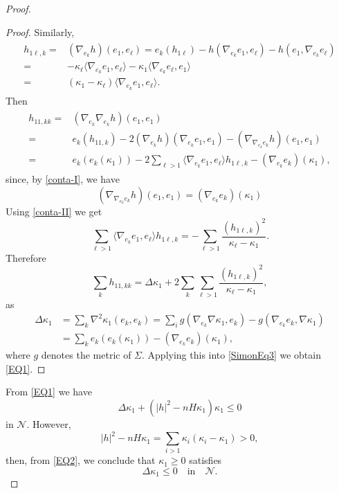 \documentclass[11pt]{amsart}
\theoremstyle{plain}
\numberwithin{equation}{section}
\numberwithin{theorem}{section}
\begin{document}
\begin{proof}
\begin{proof}
Similarly,
\begin{align}
	\begin{split}
		\label{conta-II}
	h_{1\ell  ,k}    = & \left(\nabla_{e_k} h\right)(e_1, e_\ell)  = e_k(h_{1\ell})-h\left(\nabla_{e_{k}}e_1 , e_\ell\right)-h\left(e_1,\nabla_{e_{k}}e_\ell\right) \\ =& -\kappa_\ell\langle \nabla_{e_k}e_1,e_\ell\rangle-\kappa_1\langle \nabla_{e_k}e_\ell,e_1\rangle \\ =& (\kappa_1-\kappa_\ell)\langle \nabla_{e_k}e_1,e_\ell\rangle.
	\end{split}
\end{align}
Then
\begin{align}
	\begin{split}
		\label{conta-I|I}
h_{11, kk} = & \left(\nabla_{e_k} \nabla_{e_k}  h\right)(e_1, e_1) \\  = & e_k \left( h_{11,k} \right)-2\left(\nabla_{e_k} h\right)(\nabla_{e_k}e_1, e_1) - \left(\nabla_{\nabla_{e_{k}} e_k} h\right)(e_1, e_1) \\   = & e_k\left(e_k(\kappa_1)\right)-2\sum_{\ell>1}\langle \nabla_{e_{k}}e_1, e_\ell\rangle h_{1\ell, k}-\left(\nabla_{e_{k}}e_k\right)(\kappa_1),
	\end{split}
\end{align}
since, by \eqref{conta-I}, we have
\[
 \left(\nabla_{\nabla_{e_{k}} e_k} h\right)(e_1, e_1) = \left(\nabla_{e_{k}}e_k\right)(\kappa_1)
\]
Using \eqref{conta-II} we get
\[
\sum_{\ell>1}\langle \nabla_{e_{k}}e_1, e_\ell\rangle h_{1\ell, k}= - \sum_{\ell>1}\dfrac{(h_{1\ell,k})^2}{\kappa_\ell-\kappa_1}.
\]
Therefore
\begin{equation*}
	\sum_{k} h_{11,kk}=\Delta \kappa_1+2\sum_k\sum_{\ell>1}\dfrac{(h_{1\ell,k})^2}{\kappa_\ell-\kappa_1},
\end{equation*}	
as 
\begin{align*}
\Delta\kappa_1&=\sum_k \nabla^2 \kappa_1(e_k,e_k)=\sum_ig\left( \nabla_{e_k}\nabla\kappa_1, e_k\right)-g\left(\nabla_{e_k}e_k,\nabla\kappa_1\right) \\ &= \sum_k e_k\left(e_k(\kappa_1)\right)-\left(\nabla_{e_{k}}e_k\right)(\kappa_1),
\end{align*}
where $g$ denotes the metric of $\Sigma$. Applying this into \eqref{SimonEq3} we obtain \eqref{EQ1}.
\end{proof}	 
From \eqref{EQ1} we have
\begin{equation}
	\label{EQ2}
	\Delta \kappa_1+(|h|^2-nH\kappa_1)\kappa_1\leq 0
\end{equation}
in $\mathcal N$. However,
\begin{equation}
	\label{EQ3}
	|h|^2-nH\kappa_1 =\sum_{i>1}\kappa_i\left(\kappa_i-\kappa_1\right)>0,
\end{equation}
then, from \eqref{EQ2}, we conclude that $\kappa_{1}\geq 0$ satisfies
\begin{equation}
	\label{EQ4}
	\Delta \kappa_1\leq 0 \quad \textrm{in}\quad \mathcal{N}.
\end{equation}


\end{proof}
\end{document}

